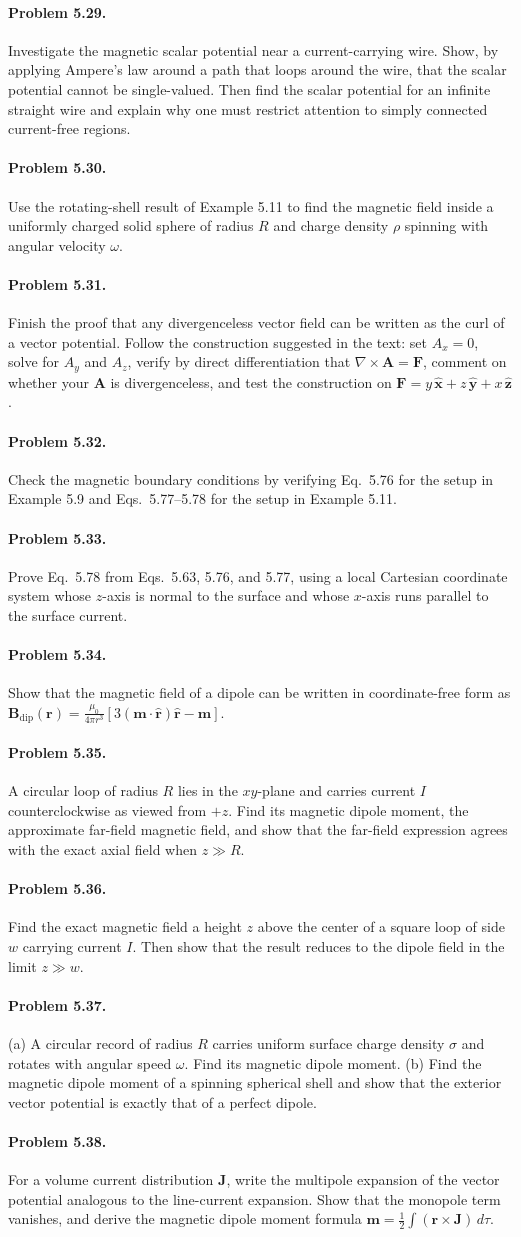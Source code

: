 \documentclass{aa}
\newcommand{\problemstatement}[2]{%
\paragraph{Problem #1.}#2\par\medskip
}
\begin{document}
\problemstatement{5.29}{Investigate the magnetic scalar potential near a current-carrying wire. Show, by applying Ampere's law around a path that loops around the wire, that the scalar potential cannot be single-valued. Then find the scalar potential for an infinite straight wire and explain why one must restrict attention to simply connected current-free regions.}
\problemstatement{5.30}{Use the rotating-shell result of Example 5.11 to find the magnetic field inside a uniformly charged solid sphere of radius \(R\) and charge density \(\rho\) spinning with angular velocity \(\omega\).}
\problemstatement{5.31}{Finish the proof that any divergenceless vector field can be written as the curl of a vector potential. Follow the construction suggested in the text: set \(A_x=0\), solve for \(A_y\) and \(A_z\), verify by direct differentiation that \(\nabla\times\mathbf A=\mathbf F\), comment on whether your \(\mathbf A\) is divergenceless, and test the construction on \(\mathbf F = y\,\hat{\mathbf x}+z\,\hat{\mathbf y}+x\,\hat{\mathbf z}\).}
\problemstatement{5.32}{Check the magnetic boundary conditions by verifying Eq.~5.76 for the setup in Example 5.9 and Eqs.~5.77--5.78 for the setup in Example 5.11.}
\problemstatement{5.33}{Prove Eq.~5.78 from Eqs.~5.63, 5.76, and 5.77, using a local Cartesian coordinate system whose \(z\)-axis is normal to the surface and whose \(x\)-axis runs parallel to the surface current.}
\problemstatement{5.34}{Show that the magnetic field of a dipole can be written in coordinate-free form as \(\mathbf B_{\mathrm{dip}}(\mathbf r)=\frac{\mu_0}{4\pi r^3}[3(\mathbf m\cdot\hat{\mathbf r})\hat{\mathbf r}-\mathbf m]\).}
\problemstatement{5.35}{A circular loop of radius \(R\) lies in the \(xy\)-plane and carries current \(I\) counterclockwise as viewed from \(+z\). Find its magnetic dipole moment, the approximate far-field magnetic field, and show that the far-field expression agrees with the exact axial field when \(z\gg R\).}
\problemstatement{5.36}{Find the exact magnetic field a height \(z\) above the center of a square loop of side \(w\) carrying current \(I\). Then show that the result reduces to the dipole field in the limit \(z\gg w\).}
\problemstatement{5.37}{(a) A circular record of radius \(R\) carries uniform surface charge density \(\sigma\) and rotates with angular speed \(\omega\). Find its magnetic dipole moment. (b) Find the magnetic dipole moment of a spinning spherical shell and show that the exterior vector potential is exactly that of a perfect dipole.}
\problemstatement{5.38}{For a volume current distribution \(\mathbf J\), write the multipole expansion of the vector potential analogous to the line-current expansion. Show that the monopole term vanishes, and derive the magnetic dipole moment formula \(\mathbf m = \frac12\int (\mathbf r\times\mathbf J)\,d\tau\).}
\end{document}
